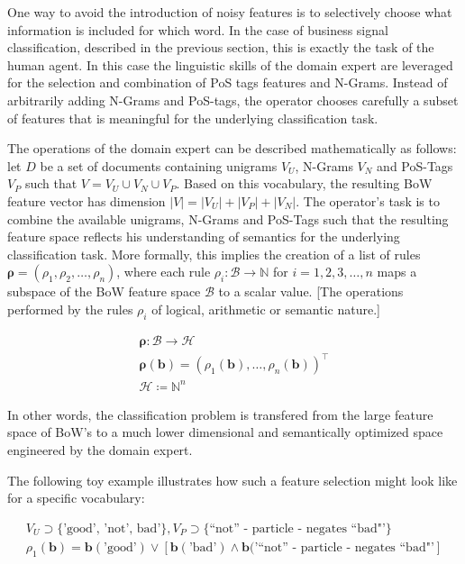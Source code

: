 One way to avoid the introduction of noisy features is to
selectively choose what information is included for which word. In the case of
business signal classification, described in the previous section, this is
exactly the task of the human agent. In this case the linguistic skills of the 
domain expert are leveraged for the selection and combination of PoS tags
features and N-Grams. Instead of arbitrarily adding N-Grams and PoS-tags, the
operator chooses carefully a subset of features that is meaningful for the
underlying classification task. 

The operations of the domain expert can be described mathematically as follows: 
let $D$ be a set of documents containing unigrams $V_U$, N-Grams $V_N$ and
PoS-Tags $V_P$ such that $V = V_U \cup V_N \cup V_P$. Based on this vocabulary, the resulting BoW
feature vector has dimension $|V| = |V_U| + |V_P| + |V_N|$.
The operator's task is to combine the available unigrams, N-Grams and PoS-Tags
such that the resulting feature space reflects his understanding
of semantics for the underlying classification task.
More formally, this implies the creation of a list of rules
$\boldsymbol{\rho} = (\rho_1, \rho_2, \ldots, \rho_n)$, where each rule $\rho_i:
\mathcal{B} \to \mathbb{N}$ for $i=1,2,3,\ldots,n$ maps a subspace of the BoW
feature space $\mathcal{B}$ to a scalar value.
[The operations performed by the rules $\rho_i$ of logical, arithmetic or
semantic nature.]

\begin{eqnarray*}
\boldsymbol\rho: \mathcal{B} \to \mathcal{H} \\
\boldsymbol{\rho}(\mathbf{b}) = (\rho_1(\mathbf{b}), \ldots,
\rho_n(\mathbf{b}))^\intercal \\
\mathcal{H} \coloneqq \mathbb{N}^n
\end{eqnarray*}

In other words, the classification problem is transfered from the large
feature space of BoW's to a much lower dimensional and semantically optimized
space engineered by the domain expert.

The following toy example illustrates how such a feature selection might look
like for a specific vocabulary: 

\begin{eqnarray*}
V_U \supset \{\text{'good', 'not', bad'}\}, V_P \supset \{\text{``not'' - particle -
negates\ ``bad"'}\} \\
\rho_1(\mathbf{b}) = \mathbf{b}(\text{'good'}) \lor \left[\mathbf{b}(\text{'bad'})
\land \mathbf{b}(\text{'``not'' - particle - negates\ ``bad"'}\right]
\end{eqnarray*}

